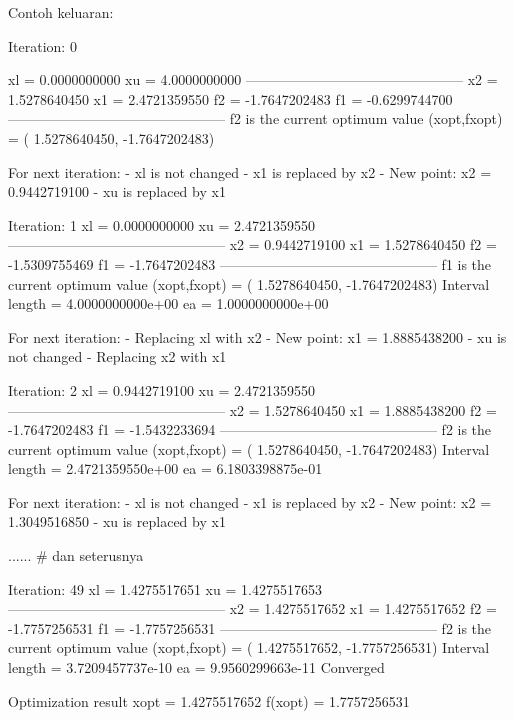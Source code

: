 Contoh keluaran:
\begin{textcode}
Iteration:  0

xl =       0.0000000000 xu =       4.0000000000
-----------------------------------------------
x2 =       1.5278640450 x1 =       2.4721359550
f2 =      -1.7647202483 f1 =      -0.6299744700
-----------------------------------------------
f2 is the current optimum value
(xopt,fxopt) = (      1.5278640450,     -1.7647202483)

For next iteration: 
- xl is not changed
- x1 is replaced by x2
- New point: x2 =       0.9442719100
- xu is replaced by x1

Iteration:  1
xl =       0.0000000000 xu =       2.4721359550
-----------------------------------------------
x2 =       0.9442719100 x1 =       1.5278640450
f2 =      -1.5309755469 f1 =      -1.7647202483
-----------------------------------------------
f1 is the current optimum value
(xopt,fxopt) = (      1.5278640450,     -1.7647202483)
Interval length =   4.0000000000e+00
ea              =   1.0000000000e+00

For next iteration: 
- Replacing xl with x2
- New point: x1 =       1.8885438200
- xu is not changed
- Replacing x2 with x1

Iteration:  2
xl =       0.9442719100 xu =       2.4721359550
-----------------------------------------------
x2 =       1.5278640450 x1 =       1.8885438200
f2 =      -1.7647202483 f1 =      -1.5432233694
-----------------------------------------------
f2 is the current optimum value
(xopt,fxopt) = (      1.5278640450,     -1.7647202483)
Interval length =   2.4721359550e+00
ea              =   6.1803398875e-01

For next iteration: 
- xl is not changed
- x1 is replaced by x2
- New point: x2 =       1.3049516850
- xu is replaced by x1

...... # dan seterusnya

Iteration:  49
xl =       1.4275517651 xu =       1.4275517653
-----------------------------------------------
x2 =       1.4275517652 x1 =       1.4275517652
f2 =      -1.7757256531 f1 =      -1.7757256531
-----------------------------------------------
f2 is the current optimum value
(xopt,fxopt) = (      1.4275517652,     -1.7757256531)
Interval length =   3.7209457737e-10
ea              =   9.9560299663e-11
Converged

Optimization result
xopt    =       1.4275517652
f(xopt) =       1.7757256531
\end{textcode}




